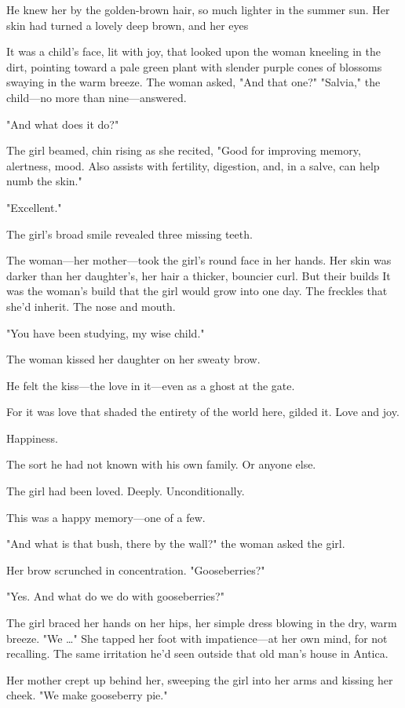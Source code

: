 He knew her by the golden-brown hair, so much lighter in the summer sun. Her skin had turned a lovely deep brown, and her eyes 

It was a child's face, lit with joy, that looked upon the woman kneeling in the dirt, pointing toward a pale green plant with slender purple cones of blossoms swaying in the warm breeze. The woman asked, "And that one?" "Salvia," the child---no more than nine---answered.

"And what does it do?"

The girl beamed, chin rising as she recited, "Good for improving memory, alertness, mood. Also assists with fertility, digestion, and, in a salve, can help numb the skin."

"Excellent."

The girl's broad smile revealed three missing teeth.

The woman---her mother---took the girl's round face in her hands. Her skin was darker than her daughter's, her hair a thicker, bouncier curl. But their builds  It was the woman's build that the girl would grow into one day. The freckles that she'd inherit. The nose and mouth.

"You have been studying, my wise child."

The woman kissed her daughter on her sweaty brow.

He felt the kiss---the love in it---even as a ghost at the gate.

For it was love that shaded the entirety of the world here, gilded it. Love and joy.

Happiness.

The sort he had not known with his own family. Or anyone else.

The girl had been loved. Deeply. Unconditionally.

This was a happy memory---one of a few.

"And what is that bush, there by the wall?" the woman asked the girl.

Her brow scrunched in concentration. "Gooseberries?"

"Yes. And what do we do with gooseberries?"

The girl braced her hands on her hips, her simple dress blowing in the dry, warm breeze. "We \ldots" She tapped her foot with impatience---at her own mind, for not recalling. The same irritation he'd seen outside that old man's house in Antica.

Her mother crept up behind her, sweeping the girl into her arms and kissing her cheek. "We make gooseberry pie."

